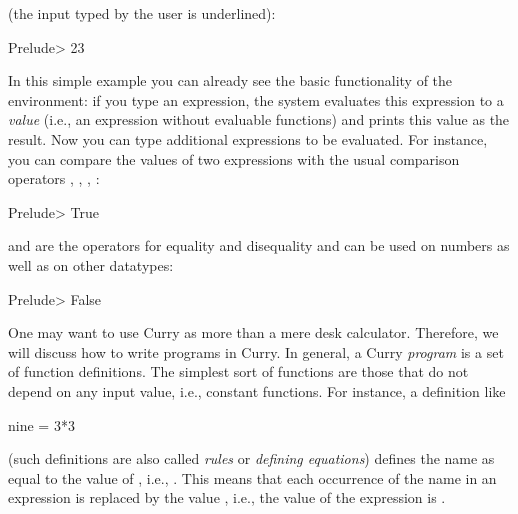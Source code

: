 (the input typed by the user is underlined):
\begin{prog}
Prelude> 
23
\end{prog}
In this simple example you can already see the basic functionality
of the environment: if you type an expression, the system
evaluates this expression to a \emph{value}
(i.e., an expression without evaluable functions)
and prints this value as the result. %
Now you can type additional expressions to be evaluated. For instance,
you can compare the values of two expressions with the
usual comparison operators \code{>}, \code{<}, \code{<=}, \code{>=}:
\begin{prog}
Prelude> 
True
\end{prog}
\code{==} and \code{/=} are the operators for equality and disequality
and can be used on numbers as well as on other datatypes:
\begin{prog}
Prelude> 
False
\end{prog}
% 
One may want to use Curry as more than a mere desk calculator. Therefore, we will discuss how to write programs in Curry.
In general, a Curry \emph{program}
is a set of function definitions.
The simplest sort of functions are those that do not depend
on any input value, i.e., constant functions.
For instance, a definition like
\begin{prog}
nine = 3*3
\end{prog}
(such definitions are also called \emph{rules}
or \emph{defining equations})
defines the name  as equal to the value of ,
i.e., . This means that each occurrence of the name 
in an expression is replaced by the value , i.e., the value
of the expression  is .

